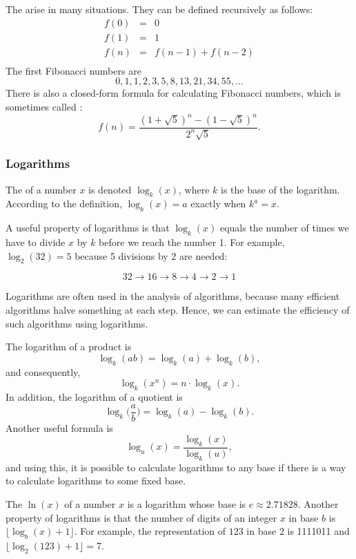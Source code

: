 
The 
arise in many situations.
They can be defined recursively as follows:
\[
\begin{array}{lcl}
f(0) & = & 0 \\
f(1) & = & 1 \\
f(n) & = & f(n-1)+f(n-2) \\
\end{array}
\]
The first Fibonacci numbers are
\[0, 1, 1, 2, 3, 5, 8, 13, 21, 34, 55, \ldots\]
There is also a closed-form formula
for calculating Fibonacci numbers, which is sometimes called
 :
\[f(n)=\frac{(1 + \sqrt{5})^n - (1-\sqrt{5})^n}{2^n \sqrt{5}}.\]

\subsubsection{Logarithms}


The  of a number $x$
is denoted $\log_k(x)$, where $k$ is the base
of the logarithm.
According to the definition,
$\log_k(x)=a$ exactly when $k^a=x$.

A useful property of logarithms is
that $\log_k(x)$ equals the number of times
we have to divide $x$ by $k$ before we reach
the number 1.
For example, $\log_2(32)=5$
because 5 divisions by 2 are needed:

\[32 \rightarrow 16 \rightarrow 8 \rightarrow 4 \rightarrow 2 \rightarrow 1 \]

Logarithms are often used in the analysis of
algorithms, because many efficient algorithms
halve something at each step.
Hence, we can estimate the efficiency of such algorithms
using logarithms.

The logarithm of a product is
\[\log_k(ab) = \log_k(a)+\log_k(b),\]
and consequently,
\[\log_k(x^n) = n \cdot \log_k(x).\]
In addition, the logarithm of a quotient is
\[\log_k\Big(\frac{a}{b}\Big) = \log_k(a)-\log_k(b).\]
Another useful formula is
\[\log_u(x) = \frac{\log_k(x)}{\log_k(u)},\]
and using this, it is possible to calculate
logarithms to any base if there is a way to
calculate logarithms to some fixed base.


The  $\ln(x)$ of a number $x$
is a logarithm whose base is $e \approx 2.71828$.
Another property of logarithms is that
the number of digits of an integer $x$ in base $b$ is
$\lfloor \log_b(x)+1 \rfloor$.
For example, the representation of
$123$ in base $2$ is 1111011 and
$\lfloor \log_2(123)+1 \rfloor = 7$.

